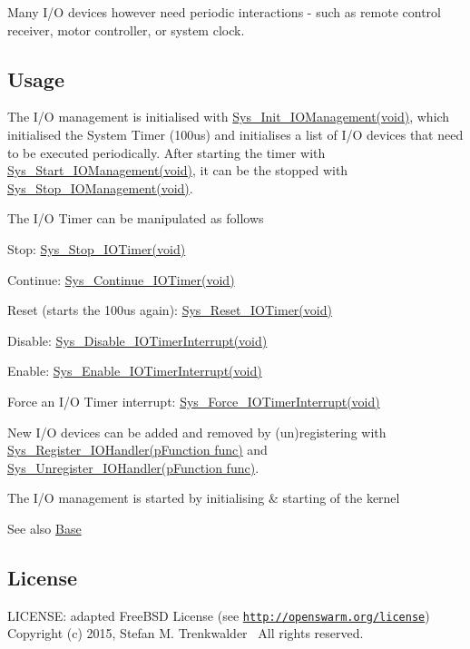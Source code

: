 Many I/\+O devices however need periodic interactions -\/ such as remote control receiver, motor controller, or system clock.\hypertarget{group__io_io_usage}{}\subsection{Usage}\label{group__io_io_usage}
The I/\+O management is initialised with \hyperlink{io_8h_ad1719208a5855f34e056a8114de973f9}{Sys\+\_\+\+Init\+\_\+\+I\+O\+Management(void)}, which initialised the System Timer (100us) and initialises a list of I/\+O devices that need to be executed periodically. After starting the timer with \hyperlink{io_8h_a6ca66df90d159586d58a19e01f3a7025}{Sys\+\_\+\+Start\+\_\+\+I\+O\+Management(void)}, it can be the stopped with \hyperlink{io_8h_a14d9a8f941c03184049f3bf18d35fb47}{Sys\+\_\+\+Stop\+\_\+\+I\+O\+Management(void)}.

The I/\+O Timer can be manipulated as follows
\begin{DoxyItemize}
\item Stop\+: \hyperlink{io_8h_a3aa1e95e0e5be1866738b77f5b504652}{Sys\+\_\+\+Stop\+\_\+\+I\+O\+Timer(void)}
\item Continue\+: \hyperlink{io_8h_a15a4d1cf4ffaac43d2c1ae131652b869}{Sys\+\_\+\+Continue\+\_\+\+I\+O\+Timer(void)}
\item Reset (starts the 100us again)\+: \hyperlink{io_8h_a022c90f875bdb0b3cf2c85ab7872f531}{Sys\+\_\+\+Reset\+\_\+\+I\+O\+Timer(void)}
\item Disable\+: \hyperlink{io_8h_a21ac049cc8b67f8851decbbd0edf9dd6}{Sys\+\_\+\+Disable\+\_\+\+I\+O\+Timer\+Interrupt(void)}
\item Enable\+: \hyperlink{io_8h_aefef1e8eb442327a4b4c7bc89d6d13ce}{Sys\+\_\+\+Enable\+\_\+\+I\+O\+Timer\+Interrupt(void)}
\item Force an I/\+O Timer interrupt\+: \hyperlink{io_8h_ac23e12fcd2478b2d820aa55dcd9460ee}{Sys\+\_\+\+Force\+\_\+\+I\+O\+Timer\+Interrupt(void)}
\end{DoxyItemize}

New I/\+O devices can be added and removed by (un)registering with \hyperlink{io_8h_a915425274eaebb4ed39d8622b90993b7}{Sys\+\_\+\+Register\+\_\+\+I\+O\+Handler(p\+Function func)} and \hyperlink{io_8h_a1b695aa5cbdf06b543b10b9661722d36}{Sys\+\_\+\+Unregister\+\_\+\+I\+O\+Handler(p\+Function func)}.

The I/\+O management is started by initialising \& starting of the kernel \begin{DoxySeeAlso}{See also}
\hyperlink{group__base}{Base}
\end{DoxySeeAlso}
\hypertarget{group__io_io_license}{}\subsection{License}\label{group__io_io_license}
L\+I\+C\+E\+N\+S\+E\+: adapted Free\+B\+S\+D License (see \href{http://openswarm.org/license}{\tt http\+://openswarm.\+org/license})~\newline
Copyright (c) 2015, Stefan M. Trenkwalder~\newline
All rights reserved. 